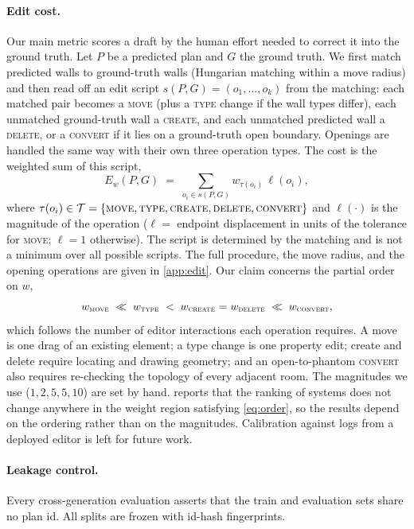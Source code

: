 \documentclass{article}
\begin{document}
\paragraph{Edit cost.}
Our main metric scores a draft by the human effort needed to correct it into
the ground truth. Let $P$ be a predicted plan and $G$ the ground truth. We
first match predicted walls to ground-truth walls (Hungarian matching within a
move radius) and then read off an edit script $s(P,G)=(o_1,\dots,o_k)$ from the
matching: each matched pair becomes a \textsc{move} (plus a \textsc{type} change
if the wall types differ), each unmatched ground-truth wall a \textsc{create},
and each unmatched predicted wall a \textsc{delete}, or a \textsc{convert} if it
lies on a ground-truth open boundary. Openings are handled the same way with
their own three operation types. The cost is the weighted sum of this script,
\begin{equation}
  E_w(P,G)\;=\;\sum_{o_i\in s(P,G)} w_{\tau(o_i)}\,\ell(o_i),
  \label{eq:edit}
\end{equation}
where $\tau(o_i)\in\mathcal{T}=\{\textsc{move},\textsc{type},\textsc{create},
\textsc{delete},\textsc{convert}\}$ and $\ell(\cdot)$ is the magnitude of the
operation ($\ell=$ endpoint displacement in units of the tolerance for
\textsc{move}; $\ell=1$ otherwise). The script is determined by the matching
and is not a minimum over all possible scripts. The full procedure, the move
radius, and the opening operations are given in \cref{app:edit}. Our claim
concerns the partial order on $w$,
\begin{equation}
  w_{\textsc{move}}\;\ll\;w_{\textsc{type}}\;<\;w_{\textsc{create}}=w_{\textsc{delete}}
  \;\ll\;w_{\textsc{convert}},
  \label{eq:order}
\end{equation}
which follows the number of editor interactions each operation requires. A move
is one drag of an existing element; a type change is one property edit; create
and delete require locating and drawing geometry; and an open-to-phantom
\textsc{convert} also requires re-checking the topology of every adjacent room.
The magnitudes we use ($1,2,5,5,10$) are set by hand.  reports
that the ranking of systems does not change anywhere in the weight region
satisfying \cref{eq:order}, so the results depend on the ordering rather than
on the magnitudes. Calibration against logs from a deployed editor is left for
future work.

\paragraph{Leakage control.}
Every cross-generation evaluation asserts that the train and evaluation sets
share no plan id. All splits are frozen with id-hash fingerprints.
\end{document}
